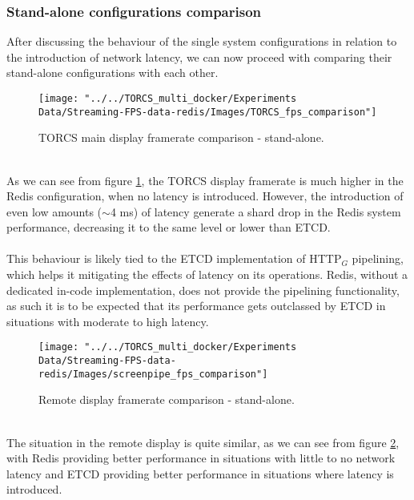 \subsubsection{Stand-alone configurations comparison}
After discussing the behaviour of the single system configurations in relation to the introduction of network latency, we can now proceed with comparing their stand-alone configurations with each other.
\begin{figure}[h!]
	\centering
	\texttt{[image: "../../TORCS\_multi\_docker/Experiments Data/Streaming-FPS-data-redis/Images/TORCS\_fps\_comparison"]}
	\caption[TORCS main display framerate comparison - stand-alone]{TORCS main display framerate comparison - stand-alone.}
	\label{fig:torcs-fps-comparison}
\end{figure}
\\ As we can see from figure \ref{fig:torcs-fps-comparison}, the TORCS display framerate is much higher in the Redis configuration, when no latency is introduced. However, the introduction of even low amounts ($\sim{}$4 ms) of latency generate a shard drop in the Redis system performance, decreasing it to the same level or lower than ETCD. \\ \\
This behaviour is likely tied to the ETCD implementation of HTTP$_G$ pipelining, which helps it mitigating the effects of latency on its operations. Redis, without a dedicated in-code implementation, does not provide the pipelining functionality, as such it is to be expected that its performance gets outclassed by ETCD in situations with moderate to high latency.
\begin{figure}[h!]
	\centering
	\texttt{[image: "../../TORCS\_multi\_docker/Experiments Data/Streaming-FPS-data-redis/Images/screenpipe\_fps\_comparison"]}
	\caption[Remote display framerate comparison - stand-alone]{Remote display framerate comparison - stand-alone.}
	\label{fig:screenpipe-fps-comparison}
\end{figure}
\\ The situation in the remote display is quite similar, as we can see from figure \ref{fig:screenpipe-fps-comparison}, with Redis providing better performance in situations with little to no network latency and ETCD providing better performance in situations where latency is introduced.

